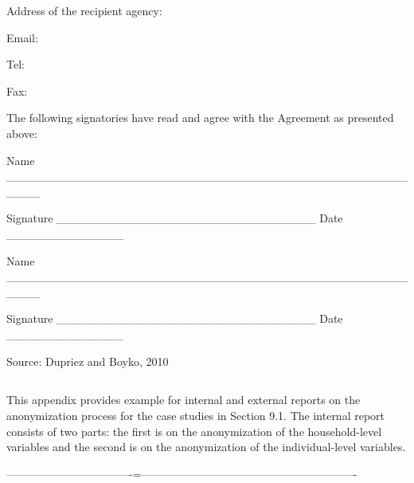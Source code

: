 \documentclass[letterpaper,10pt,english]{sphinxmanual}
\begin{document}
Address of the recipient agency:

Email:

Tel:

Fax:


The following signatories have read and agree with the Agreement as
presented above:


Name \_\_\_\_\_\_\_\_\_\_\_\_\_\_\_\_\_\_\_\_\_\_\_\_\_\_\_\_\_\_\_\_\_\_\_\_\_\_\_\_\_\_\_\_\_\_\_\_\_\_\_\_

Signature \_\_\_\_\_\_\_\_\_\_\_\_\_\_\_\_\_\_\_\_\_\_\_\_\_\_\_\_\_\_\_ Date \_\_\_\_\_\_\_\_\_\_\_\_\_\_


Name \_\_\_\_\_\_\_\_\_\_\_\_\_\_\_\_\_\_\_\_\_\_\_\_\_\_\_\_\_\_\_\_\_\_\_\_\_\_\_\_\_\_\_\_\_\_\_\_\_\_\_\_

Signature \_\_\_\_\_\_\_\_\_\_\_\_\_\_\_\_\_\_\_\_\_\_\_\_\_\_\_\_\_\_\_ Date \_\_\_\_\_\_\_\_\_\_\_\_\_\_

Source: Dupriez and Boyko, 2010


\section{  }
\label{\detokenize{appendices:appendix-c-internal-and-external-reports-for-case-studies}}
This appendix provides example for internal and external reports on the
anonymization process for the case studies in Section 9.1. The internal
report consists of two parts: the first is on the anonymization of the
household-level variables and the second is on the anonymization of the
individual-level variables.

 
———————————-=———————————————————-

\noindent{}



\chapter{}
\label{\detokenize{bibliography:bibliography}}\label{\detokenize{bibliography::doc}}
\end{document}

